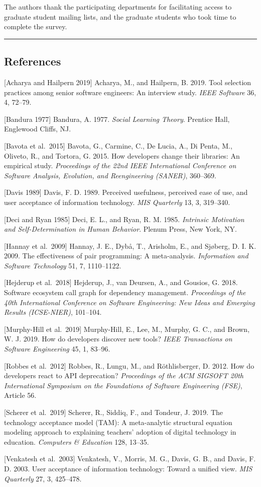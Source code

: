 \documentclass[
]{article}
\begin{document}
The authors thank the participating departments for facilitating access
to graduate student mailing lists, and the graduate students who took
time to complete the survey.

\begin{center}\rule{0.5\linewidth}{0.5pt}\end{center}

\subsection{References}\label{references}

{[}Acharya and Hailpern 2019{]} Acharya, M., and Hailpern, B. 2019. Tool
selection practices among senior software engineers: An interview study.
\emph{IEEE Software} 36, 4, 72--79.

{[}Bandura 1977{]} Bandura, A. 1977. \emph{Social Learning Theory}.
Prentice Hall, Englewood Cliffs, NJ.

{[}Bavota et al.~2015{]} Bavota, G., Carmine, C., De Lucia, A., Di
Penta, M., Oliveto, R., and Tortora, G. 2015. How developers change
their libraries: An empirical study. \emph{Proceedings of the 22nd IEEE
International Conference on Software Analysis, Evolution, and
Reengineering (SANER)}, 360--369.

{[}Davis 1989{]} Davis, F. D. 1989. Perceived usefulness, perceived ease
of use, and user acceptance of information technology. \emph{MIS
Quarterly} 13, 3, 319--340.

{[}Deci and Ryan 1985{]} Deci, E. L., and Ryan, R. M. 1985.
\emph{Intrinsic Motivation and Self-Determination in Human Behavior}.
Plenum Press, New York, NY.

{[}Hannay et al.~2009{]} Hannay, J. E., Dybå, T., Arisholm, E., and
Sjøberg, D. I. K. 2009. The effectiveness of pair programming: A
meta-analysis. \emph{Information and Software Technology} 51, 7,
1110--1122.

{[}Hejderup et al.~2018{]} Hejderup, J., van Deursen, A., and Gousios,
G. 2018. Software ecosystem call graph for dependency management.
\emph{Proceedings of the 40th International Conference on Software
Engineering: New Ideas and Emerging Results (ICSE-NIER)}, 101--104.

{[}Murphy-Hill et al.~2019{]} Murphy-Hill, E., Lee, M., Murphy, G. C.,
and Brown, W. J. 2019. How do developers discover new tools? \emph{IEEE
Transactions on Software Engineering} 45, 1, 83--96.

{[}Robbes et al.~2012{]} Robbes, R., Lungu, M., and Röthlisberger, D.
2012. How do developers react to API deprecation? \emph{Proceedings of
the ACM SIGSOFT 20th International Symposium on the Foundations of
Software Engineering (FSE)}, Article 56.

{[}Scherer et al.~2019{]} Scherer, R., Siddiq, F., and Tondeur, J. 2019.
The technology acceptance model (TAM): A meta-analytic structural
equation modeling approach to explaining teachers' adoption of digital
technology in education. \emph{Computers \& Education} 128, 13--35.

{[}Venkatesh et al.~2003{]} Venkatesh, V., Morris, M. G., Davis, G. B.,
and Davis, F. D. 2003. User acceptance of information technology: Toward
a unified view. \emph{MIS Quarterly} 27, 3, 425--478.
\end{document}
